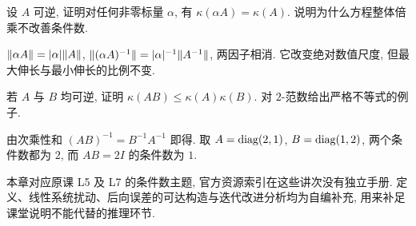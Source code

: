 \begin{exercise}
设 $A$ 可逆, 证明对任何非零标量 $\alpha$, 有 $\kappa(\alpha A)=\kappa(A)$. 说明为什么方程整体倍乘不改善条件数.
\end{exercise}
\begin{solution}
$\lVert \alpha A\rVert=|\alpha|\lVert A\rVert$, $\lVert (\alpha A)^{-1}\rVert=|\alpha|^{-1}\lVert A^{-1}\rVert$, 两因子相消. 它改变绝对数值尺度, 但最大伸长与最小伸长的比例不变.
\end{solution}
\begin{exercise}
若 $A$ 与 $B$ 均可逆, 证明 $\kappa(AB)\le\kappa(A)\kappa(B)$. 对 $2$-范数给出严格不等式的例子.
\end{exercise}
\begin{solution}
由次乘性和 $(AB)^{-1}=B^{-1}A^{-1}$ 即得. 取 $A=\operatorname{diag}(2,1)$, $B=\operatorname{diag}(1,2)$, 两个条件数都为 $2$, 而 $AB=2I$ 的条件数为 $1$.
\end{solution}
\begin{remark}
本章对应原课 L5 及 L7 的条件数主题, 官方资源索引在这些讲次没有独立手册. 定义、线性系统扰动、后向误差的可达构造与迭代改进分析均为自编补充, 用来补足课堂说明不能代替的推理环节.
\end{remark}
